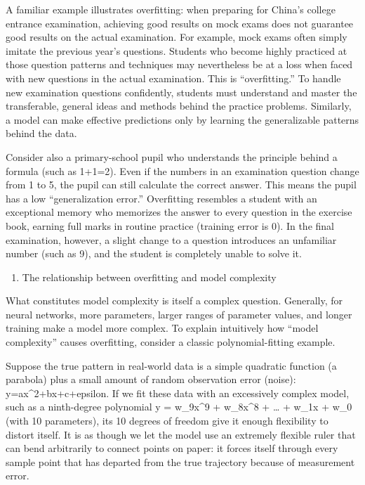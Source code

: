 A familiar example illustrates overfitting: when preparing for China's college entrance examination, achieving good results on mock exams does not guarantee good results on the actual examination. For example, mock exams often simply imitate the previous year's questions. Students who become highly practiced at those question patterns and techniques may nevertheless be at a loss when faced with new questions in the actual examination. This is ``overfitting.'' To handle new examination questions confidently, students must understand and master the transferable, general ideas and methods behind the practice problems. Similarly, a model can make effective predictions only by learning the generalizable patterns behind the data.

Consider also a primary-school pupil who understands the principle behind a formula (such as 1+1=2). Even if the numbers in an examination question change from 1 to 5, the pupil can still calculate the correct answer. This means the pupil has a low ``generalization error.'' Overfitting resembles a student with an exceptional memory who memorizes the answer to every question in the exercise book, earning full marks in routine practice (training error is 0). In the final examination, however, a slight change to a question introduces an unfamiliar number (such as 9), and the student is completely unable to solve it.

\begin{enumerate}
\def\labelenumi{\arabic{enumi}.}
\setcounter{enumi}{2}
\tightlist
\item
  The relationship between overfitting and model complexity
\end{enumerate}

What constitutes model complexity is itself a complex question. Generally, for neural networks, more parameters, larger ranges of parameter values, and longer training make a model more complex. To explain intuitively how ``model complexity'' causes overfitting, consider a classic polynomial-fitting example.

Suppose the true pattern in real-world data is a simple quadratic function (a parabola) plus a small amount of random observation error (noise): y=ax\^{}2+bx+c+epsilon. If we fit these data with an excessively complex model, such as a ninth-degree polynomial y = w\_9x\^{}9 + w\_8x\^{}8 + \ldots{} + w\_1x + w\_0 (with 10 parameters), its 10 degrees of freedom give it enough flexibility to distort itself. It is as though we let the model use an extremely flexible ruler that can bend arbitrarily to connect points on paper: it forces itself through every sample point that has departed from the true trajectory because of measurement error.

